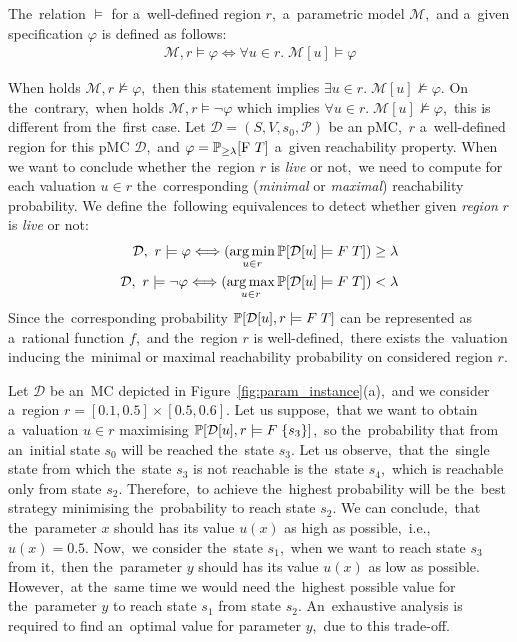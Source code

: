\begin{definition}
The~relation $\models$ for a~well-defined region $r$,~a~parametric model $\mathcal{M}$,~and a~given specification $\varphi$ is defined as follows:
\begin{align*}
    \mathcal{M}, r \models \varphi \Longleftrightarrow \forall u \in r. \; \mathcal{M}[u] \models \varphi
\end{align*}
\end{definition}
\noindent
When holds $\mathcal{M}, r \not\models \varphi$,~then this statement implies $\exists u \in r. \; \mathcal{M}[u] \not\models \varphi$.
On the~contrary,~when holds $\mathcal{M}, r \models \neg\varphi$ which implies $\forall u \in r. \; \mathcal{M}[u] \not\models \varphi$,~this is different from the~first case.
Let $\mathcal{D} = (S, V, s_0, \mathcal{P})$ be an pMC,~$r$ a~well-defined region for this pMC $\mathcal{D}$,~and $\varphi = \mathbb{P}_{\geq \lambda}[\mathrm{F}\ T]$ a~given reachability property.
When we want to conclude whether the~region $r$ is \textit{live} or not,~we need to compute for each valuation $u \in r$ the~corresponding (\textit{minimal} or \textit{maximal}) reachability probability.
We define the~following equivalences to detect whether given \textit{region} $r$ is \textit{live} or not:
\begin{align*}
    \mathcal{D},~r \models \varphi \Longleftrightarrow (\operatorname*{arg\,min}_{u \in r} \mathbb{P}[\mathcal{D}[u] \models F \; T]) \geq \lambda \\
    \mathcal{D},~r \models \neg\varphi \Longleftrightarrow (\operatorname*{arg\,max}_{u \in r} \mathbb{P}[\mathcal{D}[u] \models F \; T]) < \lambda \\
\end{align*}
Since the~corresponding probability $\mathbb{P}[\mathcal{D}[u], r \models F \; T]$ can be represented as a~rational function $f$,~and the~region $r$ is well-defined,~there exists the~valuation inducing the~minimal or maximal reachability probability on considered region $r$.

\begin{example}
Let $\mathcal{D}$ be an~MC depicted in Figure~\ref{fig:param_instance}(a),~and we  consider a~region $r = [0.1, 0.5] \times [0.5, 0.6]$.
Let us suppose,~that we want to obtain a~valuation $u \in r$ maximising $\mathbb{P}[\mathcal{D}[u], r \models F \; \{s_3 \}]$,~so the~probability that from an~initial state $s_0$ will be reached the~state $s_3$.
Let us observe,~that the~single state from which the~state $s_3$ is not reachable is the~state $s_4$,~which is reachable only from state $s_2$.
Therefore,~to achieve the~highest probability will be the~best strategy minimising the~probability to reach state $s_2$.
We can conclude,~that the~parameter $x$ should has its value $u(x)$ as high as possible,~i.e.,~$u(x)= 0.5$.
Now,~we consider the~state $s_1$,~when we want to reach state $s_3$ from it,~then the~parameter $y$ should has its value $u(x)$ as low as possible.
However,~at the~same time we would need the~highest possible value for the~parameter $y$ to reach state $s_1$ from state $s_2$.
An~exhaustive analysis is required to find an~optimal value for parameter $y$,~due to this trade-off.
\end{example}

